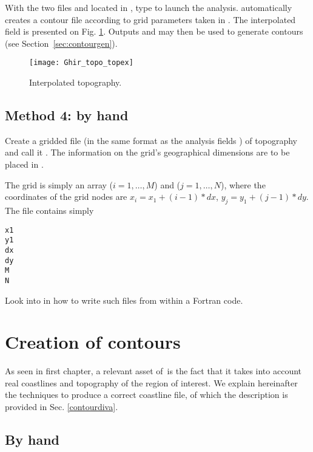 With the two files  and  located in , type  to launch the analysis.  automatically creates a contour file according to grid parameters taken in . The interpolated field is presented on Fig. \ref{fig:guirtopodiva}. Outputs  and  may then be used to generate contours (see Section~\ref{sec:contourgen}). 



\begin{figure}[htpb]
\centering
\texttt{[image: Ghir\_topo\_topex]}
\caption{Interpolated topography.\label{fig:guirtopodiva}}
\end{figure}


\subsection{Method 4: by hand}

Create a gridded file (in the same format as the analysis fields ) of topography and call
it . The information on the grid's geographical dimensions are to be placed in .

The grid is simply an array ($i=1,\ldots,M$) and ($j=1,\ldots,N$), where the coordinates of the grid nodes are
$x_i=x_1+(i-1)*dx$, $y_j=y_1+(j-1)*dy$.  The file  contains simply
\begin{verbatim}
x1
y1
dx
dy
M
N
\end{verbatim}


Look into  in  how to write such files from within a Fortran code.


\section{Creation of contours\label{sec:contourgen}}

As seen in first chapter, a relevant asset of \diva\,is the fact that it takes into account real coastlines and topography of the region of interest. We explain hereinafter the techniques to produce a correct coastline file, of which the description is provided in Sec.  \ref{contourdiva}.


\subsection{By hand}

